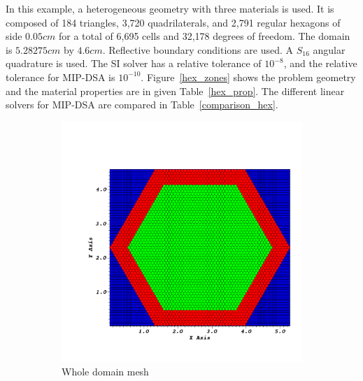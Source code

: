 \documentclass[preprint,10pt]{elsarticle}
\renewcommand{\(}{\left(}
\renewcommand{\)}{\right)}
\renewcommand{\[}{\left[}
\renewcommand{\]}{\right]}
\begin{document}
In this example, a heterogeneous geometry with three materials is used. It is 
composed of 184 triangles, 3,720 quadrilaterals, and 2,791 regular hexagons of 
side $0.05cm$ for a total of 6,695 cells and 32,178 degrees of freedom. 
The domain is $5.28275cm$ by $4.6cm$. 
Reflective boundary conditions are used. A $S_{16}$ angular 
quadrature is used. The SI solver has a relative tolerance of 
$10^{-8}$, and the relative tolerance for MIP-DSA is $10^{-10}$. Figure~\ref {hex_zones}
shows the problem geometry and the material properties are in given
Table~\ref {hex_prop}.
The different linear solvers for MIP-DSA are compared in Table~\ref {comparison_hex}.
%
\begin{figure}[!htbp]
  \centering
  \begin{subfigure}{0.45\textwidth}
    \centering
    \includegraphics[width=\textwidth]{hexa_grid0000}
    \caption{Whole domain mesh}
  \end{subfigure}
  \begin{subfigure}{0.40\textwidth}
    \centering

\end{subfigure}
\end{figure}
\end{document}
